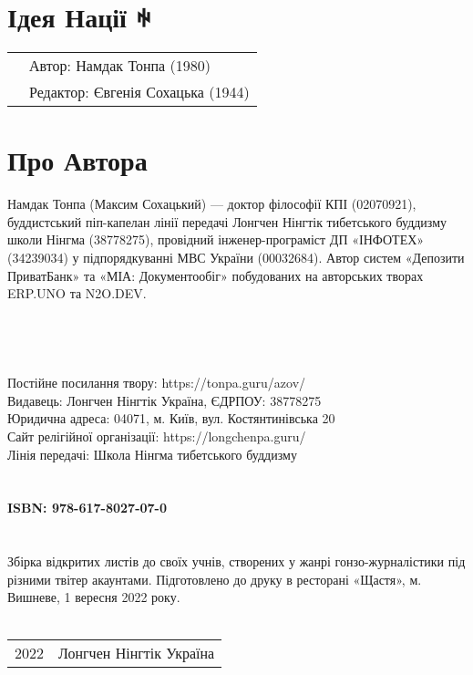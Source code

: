 \section*{Ідея Нації ꑭ}

\begin{tabular}{ll}
& Автор: Намдак Тонпа (1980)\\
& Редактор: Євгенія Сохацька (1944)\\
\end{tabular}

\section*{Про Автора}

Намдак Тонпа (Максим Сохацький) --- доктор філософії КПІ (02070921),
буддистський піп-капелан лінії передачі
Лонгчен Нінгтік тибетського буддизму школи Нінгма (38778275),
провідний інженер-програміст ДП «ІНФОТЕХ» (34239034)
у підпорядкуванні МВС України (00032684).
Автор систем «Депозити ПриватБанк» та «МІА: Документообіг»
побудованих на авторських творах ERP.UNO та N2O.DEV.
\\
\\
\\
\\
\\
Постійне посилання твору: https://tonpa.guru/azov/ \\
Видавець: Лонгчен Нінгтік Україна, ЄДРПОУ: 38778275 \\
Юридична адреса: 04071, м. Київ, вул. Костянтинівська 20 \\
Сайт релігійної організації: https://longchenpa.guru/ \\
Лінія передачі: Школа Нінгма тибетського буддизму \\
\\
\\
{\bf ISBN: 978-617-8027-07-0 \hspace{2em}} \\
\\
\\
\indent Збірка відкритих листів до своїх учнів, створених у жанрі гонзо-журналістики під різними твітер акаунтами.
Підготовлено до друку в ресторані «Щастя»,
м. Вишневе, 1 вересня 2022 року. \\
\\

\begin{tabular}{ll}
\textcopyright{} 2022 & Лонгчен Нінгтік Україна
\end{tabular}
